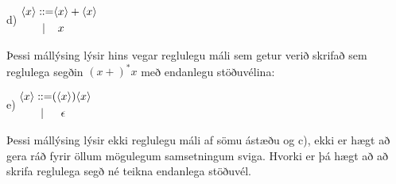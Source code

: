 \documentclass[leqno]{article}
\begin{document}
\begin{itemize}
 \vspace{3em}

 \begin{minipage}{.20\linewidth}
			\item[d)] $\begin{alignedat}{3}
\langle & x & \rangle :& \hspace{-.3em}:= & \langle & x \rangle + \langle x \rangle \\
		&   &          &  |               & & x \\
    \end{alignedat}$
\end{minipage}
\begin{minipage}{.80\linewidth}
	Þessi mállýsing lýsir hins vegar reglulegu máli sem getur verið skrifað 
	sem reglulega segðin $(x+)^*x$ með endanlegu stöðuvélina:

\vspace{1.5em}

\begin{center}
\end{center}
\end{minipage}

\vspace{3em}

\begin{minipage}{.20\linewidth}
			\item[e)] $\begin{alignedat}{3}
\langle & x & \rangle :& \hspace{-.3em}:= & (\langle & x \rangle)  \langle x \rangle \\
		&   &          &  |               & & \epsilon \\
    \end{alignedat}$

\end{minipage}
\begin{minipage}{.80\linewidth}

	Þessi mállýsing lýsir ekki reglulegu máli af sömu ástæðu og c), ekki er 
	hægt að gera ráð fyrir öllum mögulegum samsetningum sviga. Hvorki er þá 
	hægt að að skrifa reglulega segð né teikna endanlega stöðuvél.


\end{minipage}
\end{itemize}
\end{document}
